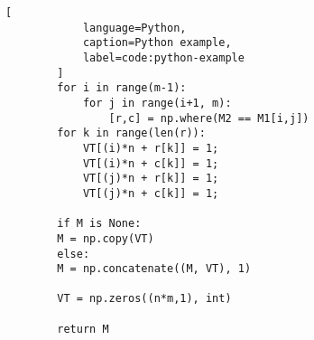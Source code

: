 \begin{appendix}
\begin{lstlisting}[
            language=Python,
            caption=Python example,
            label=code:python-example
        ]
        for i in range(m-1):
            for j in range(i+1, m):
                [r,c] = np.where(M2 == M1[i,j])
        for k in range(len(r)):
            VT[(i)*n + r[k]] = 1;
            VT[(i)*n + c[k]] = 1;
            VT[(j)*n + r[k]] = 1;
            VT[(j)*n + c[k]] = 1;
        
        if M is None:
        M = np.copy(VT)
        else:
        M = np.concatenate((M, VT), 1)
        
        VT = np.zeros((n*m,1), int)
        
        return M
        \end{lstlisting}
\end{appendix}